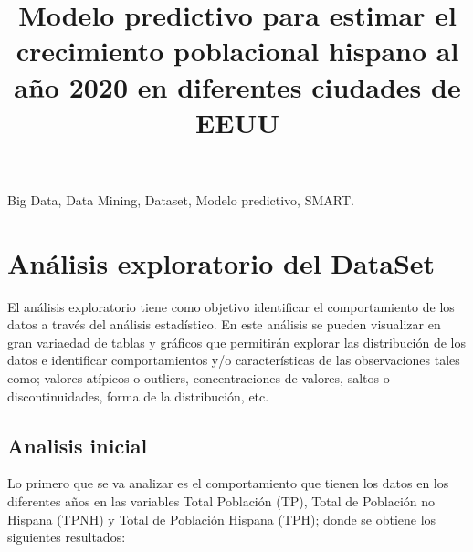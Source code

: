 \documentclass[conference]{IEEEtran}\usepackage[]{graphicx}\usepackage[]{color}
\begin{document}
	
	
\title{Modelo predictivo para estimar el crecimiento poblacional hispano al a\~no 2020 en diferentes ciudades de EEUU}

\author{
}
\maketitle



\begin{IEEEkeywords}
	Big Data, Data Mining, Dataset, Modelo predictivo, SMART.
\end{IEEEkeywords}






	

\section{Análisis exploratorio del DataSet}
El análisis exploratorio tiene como objetivo identificar el comportamiento de los datos a través del análisis estadístico. En este análisis se pueden visualizar en gran variaedad de tablas y gráficos que permitirán explorar las distribución de los datos e identificar comportamientos y/o características de las observaciones tales como; valores atípicos o outliers, concentraciones de valores, saltos o discontinuidades, forma de la distribución, etc.   



\subsection{Analisis inicial}
Lo primero que se va analizar es el comportamiento que tienen los datos en los diferentes años en las variables Total Población (TP), Total de Población no Hispana (TPNH) y Total de Población Hispana (TPH); donde se obtiene los siguientes resultados:
\end{document}
